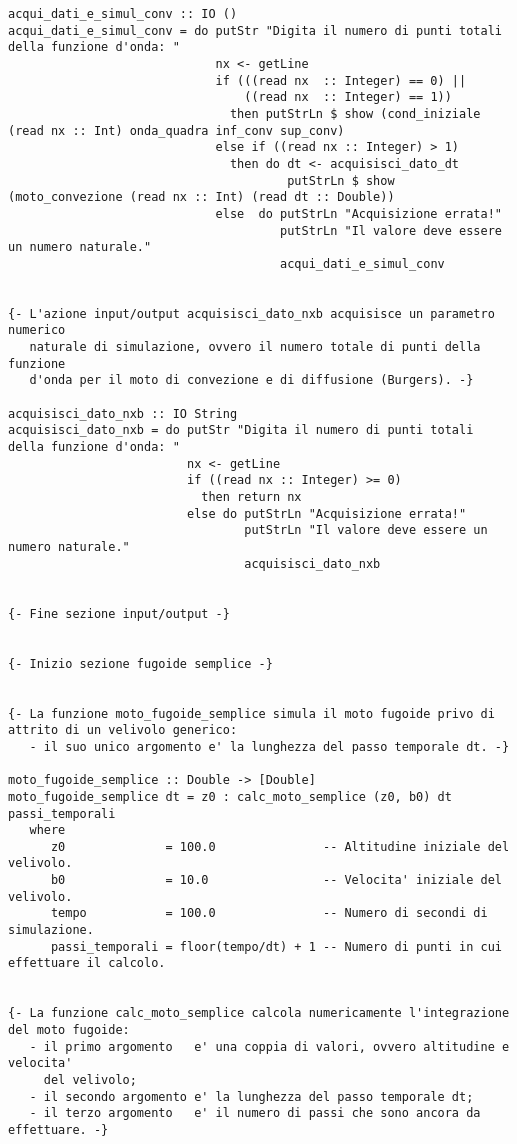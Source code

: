 \begin{verbatim}
acqui_dati_e_simul_conv :: IO ()
acqui_dati_e_simul_conv = do putStr "Digita il numero di punti totali della funzione d'onda: "
                             nx <- getLine
                             if (((read nx  :: Integer) == 0) ||
                                 ((read nx  :: Integer) == 1)) 
                               then putStrLn $ show (cond_iniziale (read nx :: Int) onda_quadra inf_conv sup_conv)
                             else if ((read nx :: Integer) > 1)
                               then do dt <- acquisisci_dato_dt
                                       putStrLn $ show (moto_convezione (read nx :: Int) (read dt :: Double))
                             else  do putStrLn "Acquisizione errata!"
                                      putStrLn "Il valore deve essere un numero naturale."
                                      acqui_dati_e_simul_conv


{- L'azione input/output acquisisci_dato_nxb acquisisce un parametro numerico
   naturale di simulazione, ovvero il numero totale di punti della funzione
   d'onda per il moto di convezione e di diffusione (Burgers). -}

acquisisci_dato_nxb :: IO String
acquisisci_dato_nxb = do putStr "Digita il numero di punti totali della funzione d'onda: "
                         nx <- getLine
                         if ((read nx :: Integer) >= 0)
                           then return nx
                         else do putStrLn "Acquisizione errata!"
                                 putStrLn "Il valore deve essere un numero naturale."
                                 acquisisci_dato_nxb 


{- Fine sezione input/output -}


{- Inizio sezione fugoide semplice -}


{- La funzione moto_fugoide_semplice simula il moto fugoide privo di attrito di un velivolo generico:
   - il suo unico argomento e' la lunghezza del passo temporale dt. -}

moto_fugoide_semplice :: Double -> [Double]
moto_fugoide_semplice dt = z0 : calc_moto_semplice (z0, b0) dt passi_temporali
   where
      z0              = 100.0               -- Altitudine iniziale del velivolo.
      b0              = 10.0                -- Velocita' iniziale del velivolo.
      tempo           = 100.0               -- Numero di secondi di simulazione.
      passi_temporali = floor(tempo/dt) + 1 -- Numero di punti in cui effettuare il calcolo.


{- La funzione calc_moto_semplice calcola numericamente l'integrazione del moto fugoide:
   - il primo argomento   e' una coppia di valori, ovvero altitudine e velocita' 
     del velivolo;
   - il secondo argomento e' la lunghezza del passo temporale dt;
   - il terzo argomento   e' il numero di passi che sono ancora da effettuare. -}


\end{verbatim}
